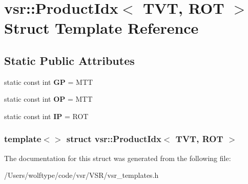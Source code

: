 \hypertarget{structvsr_1_1_product_idx_3_01_t_v_t_00_01_r_o_t_01_4}{\section{vsr\-:\-:Product\-Idx$<$ T\-V\-T, R\-O\-T $>$ Struct Template Reference}
\label{structvsr_1_1_product_idx_3_01_t_v_t_00_01_r_o_t_01_4}
}
\subsection*{Static Public Attributes}
\begin{DoxyCompactItemize}
\item 
\hypertarget{structvsr_1_1_product_idx_3_01_t_v_t_00_01_r_o_t_01_4_a1ef7d8a0c9a31e8a76357287f0c63085}{static const int {\bfseries G\-P} = M\-T\-T}\label{structvsr_1_1_product_idx_3_01_t_v_t_00_01_r_o_t_01_4_a1ef7d8a0c9a31e8a76357287f0c63085}

\item 
\hypertarget{structvsr_1_1_product_idx_3_01_t_v_t_00_01_r_o_t_01_4_ad90d557a3303a2f690be4f22677d095d}{static const int {\bfseries O\-P} = M\-T\-T}\label{structvsr_1_1_product_idx_3_01_t_v_t_00_01_r_o_t_01_4_ad90d557a3303a2f690be4f22677d095d}

\item 
\hypertarget{structvsr_1_1_product_idx_3_01_t_v_t_00_01_r_o_t_01_4_ab32e3e89d8e37176c60251697a2bbc0a}{static const int {\bfseries I\-P} = R\-O\-T}\label{structvsr_1_1_product_idx_3_01_t_v_t_00_01_r_o_t_01_4_ab32e3e89d8e37176c60251697a2bbc0a}

\end{DoxyCompactItemize}
\subsubsection*{template$<$$>$ struct vsr\-::\-Product\-Idx$<$ T\-V\-T, R\-O\-T $>$}



The documentation for this struct was generated from the following file\-:\begin{DoxyCompactItemize}
\item 
/\-Users/wolftype/code/vsr/\-V\-S\-R/vsr\-\_\-templates.\-h\end{DoxyCompactItemize}
